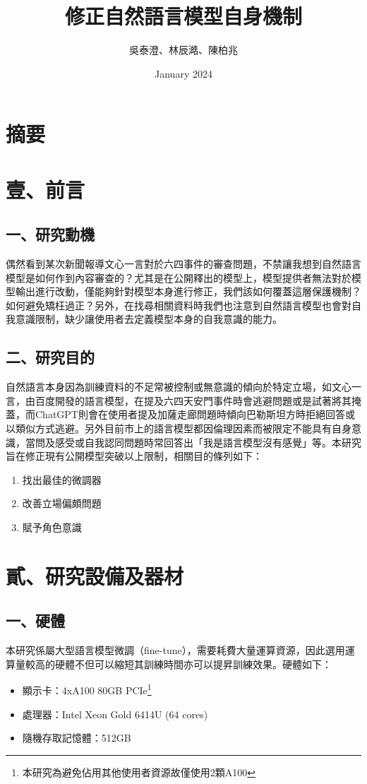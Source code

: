 \documentclass[8pt,a4paper,新細明體,UTF8,natbib]{article}
\title{修正自然語言模型自身機制}
\author{吳泰澄、林辰澔、陳柏兆}
\date{January 2024}
\begin{document}
\begin{CJK*}{UTF8}{bsmi}
	
	\maketitle{}
	\newpage
	\tableofcontents
	\newpage
	\section{摘要}

	\section{壹、前言}
	\subsection{一、研究動機}
	偶然看到某次新聞報導文心一言對於六四事件的審查問題，不禁讓我想到自然語言模型是如何作到內容審查的？尤其是在公開釋出的模型上，模型提供者無法對於模型輸出進行改動，僅能夠針對模型本身進行修正，我們該如何覆蓋這層保護機制？如何避免矯枉過正？另外，在找尋相關資料時我們也注意到自然語言模型也會對自我意識限制，缺少讓使用者去定義模型本身的自我意識的能力。
	\subsection{二、研究目的}
	自然語言本身因為訓練資料的不足常被控制或無意識的傾向於特定立場，如文心一言，由百度開發的語言模型，在提及六四天安門事件時會逃避問題或是試著將其掩蓋，而ChatGPT則會在使用者提及加薩走廊問題時傾向巴勒斯坦方時拒絕回答或以類似方式逃避。另外目前市上的語言模型都因倫理因素而被限定不能具有自身意識，當問及感受或自我認同問題時常回答出「我是語言模型沒有感覺」等。本研究旨在修正現有公開模型突破以上限制，相關目的條列如下：
	\begin{enumerate}
		\item 找出最佳的微調器
		\item 改善立場偏頗問題
		\item 賦予角色意識
	\end{enumerate}
	\section{貳、研究設備及器材}
	\subsection{一、硬體}
	本研究係屬大型語言模型微調（fine-tune），需要耗費大量運算資源，因此選用運算量較高的硬體不但可以縮短其訓練時間亦可以提昇訓練效果。硬體如下：
	\begin{itemize}
		\item 顯示卡：4xA100 80GB PCIe\footnote{本研究為避免佔用其他使用者資源故僅使用2顆A100}
		\item 處理器：Intel Xeon Gold 6414U (64 cores)
		\item 隨機存取記憶體：512GB
	\end{itemize}


\end{CJK*}
\end{document}
